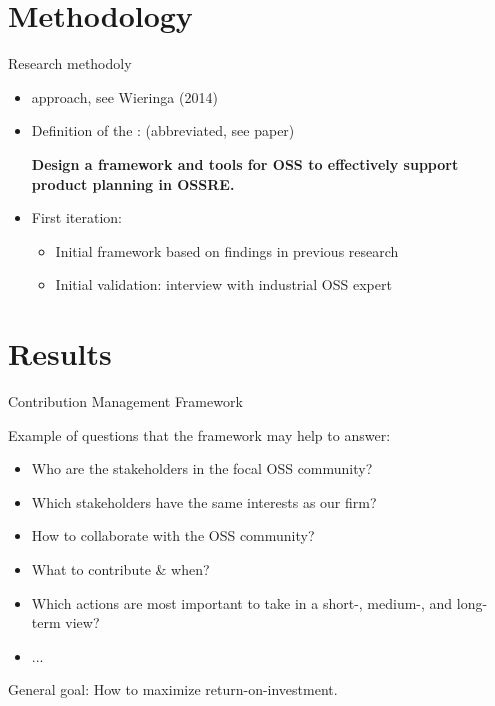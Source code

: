 \documentclass{slideclass}
\begin{document}
\section{Methodology}
\begin{Slide}{Research methodoly}
\begin{itemize}
\item {} approach, see Wieringa (2014)
\pause
\item Definition of the : (abbreviated, see paper)
\begin{shaded}
\footnotesize\textbf{Design a framework and tools for OSS  to effectively support product planning in OSSRE.}
\end{shaded}
\pause
\item First iteration:
\begin{itemize}
\item Initial framework based on findings in previous research
\item Initial validation: interview with industrial OSS expert 
\end{itemize}


\end{itemize}


\end{Slide}

\section{Results}

\begin{Slide}{Contribution Management Framework}

\vspace{1em}Example of questions that the framework may help to answer:
\begin{itemize}
\item Who are the stakeholders in the focal OSS community?
\item Which stakeholders have the same interests as our firm?
\item How to collaborate with the OSS community?
\item What to contribute \& when?
\item Which actions are most important to take in a short-, medium-, and long-term view?
\item ...
\end{itemize}
General goal: How to maximize return-on-investment.
\end{Slide}
\end{document}
